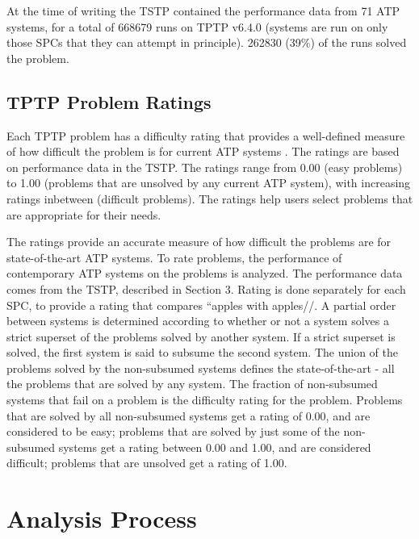 \documentclass[runningheads]{llncs}
\begin{document}
At the time of writing the TSTP contained the performance data from 71 ATP systems, for a total 
of 668679 runs on TPTP v6.4.0 (systems are run on only those SPCs that they can attempt in 
principle).
262830 (39\%) of the runs solved the problem.

\subsection{TPTP Problem Ratings}
\label{Ratings}

Each TPTP problem has a difficulty rating that provides a well-defined measure of how difficult 
the problem is for current ATP systems \cite{SS01}.
The ratings are based on performance data in the TSTP.
The ratings range from 0.00 (easy problems) to 1.00 (problems that are unsolved by any current 
ATP system), with increasing ratings inbetween (difficult problems).
The ratings help users select problems that are appropriate for their needs.

The ratings provide an accurate measure of how difficult the problems are for state-of-the-art 
ATP systems. 
To rate problems, the performance of contemporary ATP systems on the problems is analyzed. 
The performance data comes from the TSTP, described in Section 3. 
Rating is done separately for each SPC, to provide a rating that compares ``apples with apples//. 
A partial order between systems is determined according to whether or not a system solves a strict 
superset of the problems solved by another system. 
If a strict superset is solved, the first system is said to subsume the second system. 
The union of the problems solved by the non-subsumed systems defines the state-of-the-art - all 
the problems that are solved by any system. 
The fraction of non-subsumed systems that fail on a problem is the difficulty rating for the 
problem. 
Problems that are solved by all non-subsumed systems get a rating of 0.00, and are considered to 
be easy; problems that are solved by just some of the non-subsumed systems get a rating between 
0.00 and 1.00, and are considered difficult; problems that are unsolved get a rating of 1.00.

\section{Analysis Process}
\label{Analysis}
\end{document}
